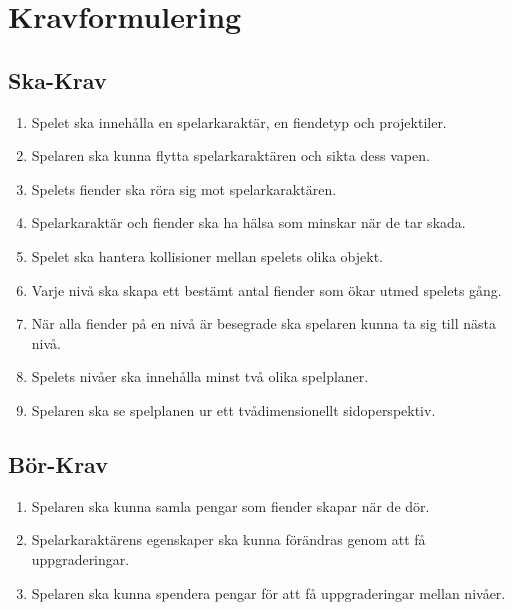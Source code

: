 \documentclass{TDP005mall}
\begin{document}
\section{Kravformulering}

\subsection{Ska-Krav}

\begin{enumerate}
\item Spelet ska innehålla en spelarkaraktär, en fiendetyp och projektiler.
\item Spelaren ska kunna flytta spelarkaraktären och sikta dess vapen. 
\item Spelets fiender ska röra sig mot spelarkaraktären.
\item Spelarkaraktär och fiender ska ha hälsa som minskar när de tar skada.
\item Spelet ska hantera kollisioner mellan spelets olika objekt.
\item Varje nivå ska skapa ett bestämt antal fiender som ökar utmed spelets gång.
\item När alla fiender på en nivå är besegrade ska spelaren kunna ta sig till nästa nivå. 
\item Spelets nivåer ska innehålla minst två olika spelplaner.
\item Spelaren ska se spelplanen ur ett tvådimensionellt sidoperspektiv.
\end{enumerate}

\subsection{Bör-Krav}
\begin{enumerate}
\item Spelaren ska kunna samla pengar som fiender skapar när de dör.
\item Spelarkaraktärens egenskaper ska kunna förändras genom att få uppgraderingar. 
\item Spelaren ska kunna spendera pengar för att få uppgraderingar mellan nivåer.
\end{enumerate}
\end{document}
